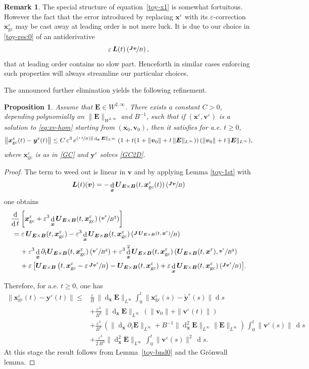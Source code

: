 \documentclass[JEP,XML,SOM,Unicode]{cedram}
\newcommand{\Psfrac}[2]{(\sfrac{#1}{#2})}
\let\eps\varepsilon
\let\d\partial
\DeclareMathOperator\dD{d}\let\dd\dD
\theoremstyle{plain}
\newtheorem{proposition}[theorem]{Proposition}
\theoremstyle{definition}
\newtheorem{remark}[theorem]{Remark}
\newcommand\br{\begin{remark}}
\newcommand\er{\end{remark}}
\newcommand{\bpr}{\begin{proposition}}
\newcommand{\epr}{\end{proposition}}
\newcommand\bB{{\boldsymbol B}}
\newcommand\bE{{\boldsymbol E}}
\newcommand\bJ{{\boldsymbol J}}
\newcommand\bL{{\boldsymbol L}}
\newcommand\bU{{\boldsymbol U}}
\newcommand\bfv{{\boldsymbol v}}
\newcommand\bfx{{\boldsymbol x}}
\newcommand\bfy{{\boldsymbol y}}
\newcommand\tby{\widetilde{\bfy}}
\newcommand{\GC}{\bfx_\mathrm{gc}}
\newcommand{\EcB}{\bU_{\bE\times\bB}}
\begin{document}
\br\label{antiderivative}
The special structure of equation~\eqref{toy-x1} is somewhat fortuitous. However the fact that the error introduced by replacing $\bfx^\eps$ with its $\eps$-correction $\GC^\eps$ may be cast away at leading order is not mere luck. It is due to our choice in \eqref{toy-res:0} of an antiderivative
\[
\eps\,\bL(t)\left(\sfrac{\bJ\bfv}{B}\right),
\]
that at leading order contains no slow part. Henceforth in similar cases enforcing such properties will always streamline our particular choices.
\er

The announced further elimination yields the following refinement.

\bpr
\label{toy-x}
Assume that $\bE\in W^{2,\infty}$. There exists
a constant $C>0$, depending polynomially on $\|\bE\|_{W^{2,\infty}}$ and
$B^{-1}$, such that if $(\bfx^\eps,\bfv^\eps)$ is a solution to
\eqref{eq:xv-hom} starting from $(\bfx_0,\bfv_0)$, then it satisfies for a.e. $t\geq0$,
\[
\bigl\|\GC^\eps(t)-\bfy^\eps(t)\bigr\|
\leq C\,\eps^3\,e^{\Psfrac{\eps\,t}{B}\|\dD_\bfx\bE\|_{L^\infty}}\,
(1+t(1+\|\bfv_0\|+t\,\|\bE\|_{L^\infty}))\,
(\|\bfv_0\|+t\,\|\bE\|_{L^\infty}),
\]
where $\GC^\eps$ is as in \eqref{GC} and $\bfy^\eps$ solves
\eqref{GC2D}.
\epr

\begin{proof}
The term to weed out is linear in $\bfv$ and by applying Lemma \ref{toy-1st} with
\[\bL(t)(\bfv)=-\dD_\bfx\EcB(t,\GC^\eps(t))\left(\sfrac{\bJ\bfv}{B}\right)
\]
one obtains
\begin{align*}
\frac{\dD}{\dD t}&\left[\GC^\eps+\eps^3\dD_\bfx\EcB(t,\GC^\eps)\left(\sfrac{\bfv^\eps}{B^2}\right)
\right]
\\
&\hspace*{-4mm}{}=\eps\,\EcB(t,\GC^\eps)
-\eps^3\dD_\bfx\EcB(t,\GC^\eps)\left(\sfrac{\bJ\,\EcB(t,\bfx^\eps)}{B}\right)\\
&{}+\eps^3\dD_\bfx\d_t\EcB(t,\GC^\eps)\left(\sfrac{\bfv^\eps}{B^2}\right)
+\eps^3\dD_\bfx^2\EcB(t,\GC^\eps)\left(\EcB(t,\bfx^\eps),\sfrac{\bfv^\eps}{B^2}\right)\\
&{}+\eps\,\bigl[\EcB\left(t,\GC^\eps-\eps\,\sfrac{\bJ\bfv^\eps}{B}\right)-\EcB(t,\GC^\eps)
+\eps\dD_\bfx\EcB(t,\GC^\eps)\left(\sfrac{\bJ\bfv^\eps}{B}\right)\bigr].
\end{align*}

Therefore, for a.e. $t\geq 0$, one has
\begin{align*}
\|\GC^\eps(t)-\bfy^\eps(t)\|
\leq{}& \frac{\eps}{B}\,\|{\dD_\bfx\bE}\|_{L^\infty}\int_0^t\|\GC^\eps(s)-\tby^\eps(s)\|\dD s \\
& +\frac{\eps^3}{B^3}\,\|{\dD_\bfx\bE}\|_{L^\infty}\,(\|\bfv_0\|+\|\bfv^\eps(t)\|)\\
&+\frac{\eps^3}{B^3}
\,(\|{\dD_\bfx\d_t\bE}\|_{L^\infty}+B^{-1}\|{\dD_\bfx^2\bE}\|_{L^\infty}\|\bE\|_{L^\infty})
\,\int_0^t\|\bfv^\eps(s)\|\,\dD s\\
&+\frac{\eps^3}{2\,B^3}\|{\dD_\bfx^2\bE}\|_{L^\infty}
\,\int_0^t\|\bfv^\eps(s)\|^2\,\dD s.
\end{align*}
At this stage the result follows from Lemma~\ref{toy-bnd0} and the Grönwall lemma.
\end{proof}
\end{document}
